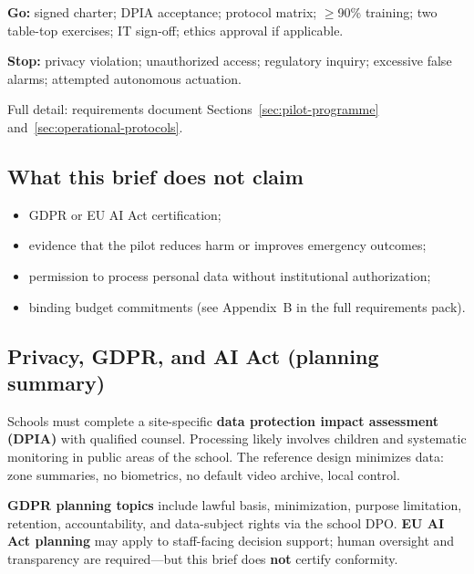 \textbf{Go:} signed charter; DPIA acceptance; protocol matrix; $\geq$90\% training; two table-top exercises;
IT sign-off; ethics approval if applicable.

\textbf{Stop:} privacy violation; unauthorized access; regulatory inquiry; excessive false alarms;
attempted autonomous actuation.

Full detail: requirements document Sections~\ref{sec:pilot-programme} and~\ref{sec:operational-protocols}.









\subsection{What this brief does not claim}

\begin{itemize}[noitemsep]
  \item GDPR or EU AI Act certification;
  \item evidence that the pilot reduces harm or improves emergency outcomes;
  \item permission to process personal data without institutional authorization;
  \item binding budget commitments (see Appendix~B in the full requirements pack).
\end{itemize}

\subsection{Privacy, GDPR, and AI Act (planning summary)}

Schools must complete a site-specific \textbf{data protection impact assessment (DPIA)} with
qualified counsel.
Processing likely involves children and systematic monitoring in public areas of the school.
The reference design minimizes data: zone summaries, no biometrics, no default video archive,
local control.

\textbf{GDPR planning topics} include lawful basis, minimization, purpose limitation, retention,
accountability, and data-subject rights via the school DPO.
\textbf{EU AI Act planning} may apply to staff-facing decision support; human oversight and
transparency are required---but this brief does \textbf{not} certify conformity.

